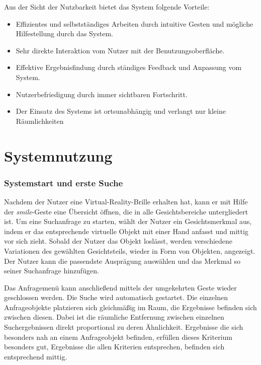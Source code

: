 \documentclass{sigchi-ext}
\begin{document}
Aus der Sicht der Nutzbarkeit bietet das System folgende Vorteile:
\begin{itemize}\compresslist%
\item Effizientes und selbstständiges Arbeiten durch intuitive Gesten
  und mögliche Hilfestellung durch das System.
\item Sehr direkte Interaktion vom Nutzer mit der Benutzungsoberfläche.
\item Effektive Ergebnisfindung durch ständiges Feedback und Anpassung vom System.
\item Nutzerbefriedigung durch immer sichtbaren Fortschritt.
\item Der Einsatz des Systems ist ortsunabhängig und verlangt nur kleine Räumlichkeiten
\end{itemize}

\section{Systemnutzung}
\subsubsection{Systemstart und erste Suche}
Nachdem der Nutzer eine Virtual-Reality-Brille erhalten hat, kann er mit Hilfe der \textit{smile}-Geste eine Übersicht öffnen, die in alle Gesichtsbereiche untergliedert ist. Um eine Suchanfrage zu starten, wählt der Nutzer ein Gesichtsmerkmal aus, indem er das entsprechende virtuelle Objekt mit einer Hand anfasst und mittig vor sich zieht. Sobald der Nutzer das Objekt loslässt, werden verschiedene Variationen des gewählten Gesichtsteils, wieder in Form von Objekten, angezeigt. Der Nutzer kann die passendste Ausprägung auswählen und das Merkmal so seiner Suchanfrage hinzufügen.

Das Anfragemenü kann anschließend mittels der umgekehrten Geste wieder
geschlossen werden. Die Suche wird automatisch gestartet. Die
einzelnen Anfrageobjekte platzieren sich gleichmäßig im Raum, die
Ergebnisse befinden sich zwischen diesen. Dabei ist die räumliche
Entfernung zwischen einzelnen Suchergebnissen direkt proportional zu
deren Ähnlichkeit. Ergebnisse die sich besonders nah an einem
Anfrageobjekt befinden, erfüllen dieses Kriterium besonders gut, Ergebnisse die allen Kriterien entsprechen, befinden sich entsprechend mittig.
\end{document}
